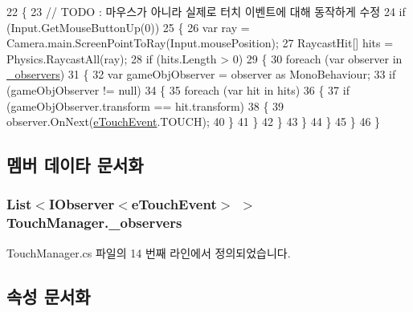 \begin{DoxyCode}
22     \{
23         \textcolor{comment}{// TODO : 마우스가 아니라 실제로 터치 이벤트에 대해 동작하게 수정}
24         \textcolor{keywordflow}{if} (Input.GetMouseButtonUp(0))
25         \{
26             var ray = Camera.main.ScreenPointToRay(Input.mousePosition);
27             RaycastHit[] hits = Physics.RaycastAll(ray);
28             \textcolor{keywordflow}{if} (hits.Length > 0)
29             \{
30                 \textcolor{keywordflow}{foreach} (var observer \textcolor{keywordflow}{in} \hyperlink{class_touch_manager_a90d8ccdafc722f2d17dd0c7c818631c4}{\_observers})
31                 \{
32                     var gameObjObserver = observer as MonoBehaviour;
33                     \textcolor{keywordflow}{if} (gameObjObserver != null)
34                     \{
35                         \textcolor{keywordflow}{foreach} (var hit \textcolor{keywordflow}{in} hits)
36                         \{
37                             \textcolor{keywordflow}{if} (gameObjObserver.transform == hit.transform)
38                             \{
39                                 observer.OnNext(\hyperlink{_touch_manager_8cs_ae33e321a424fe84ba8b2fdb81ad40a68}{eTouchEvent}.TOUCH);
40                             \}
41                         \}
42                     \}
43                 \}
44             \}
45         \}
46     \}
\end{DoxyCode}


\subsection{멤버 데이타 문서화}
\subsubsection[{\texorpdfstring{\+\_\+observers}{_observers}}]{\setlength{\rightskip}{0pt plus 5cm}List$<${\bf I\+Observer}$<${\bf e\+Touch\+Event}$>$ $>$ Touch\+Manager.\+\_\+observers\hspace{0.3cm}{\ttfamily [private]}}\hypertarget{class_touch_manager_a90d8ccdafc722f2d17dd0c7c818631c4}{}\label{class_touch_manager_a90d8ccdafc722f2d17dd0c7c818631c4}


Touch\+Manager.\+cs 파일의 14 번째 라인에서 정의되었습니다.



\subsection{속성 문서화}
